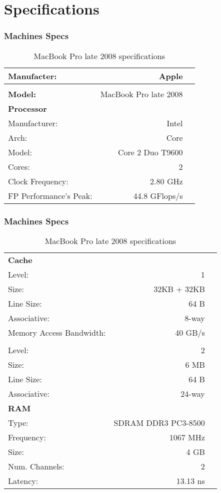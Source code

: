 \documentclass{beamer}
\begin{document}
\section{Specifications}
\begin{frame}
	\frametitle{Machines Specs}
	{\small
	\begin{table}[!htp]
		\begin{tabular}{lrl}
			\hline 
			\textbf{Manufacter:} & Apple \\
			\hline \\
			\textbf{Model:} & MacBook Pro late 2008 \\
			\hline 
			\textbf{Processor} & & \\
			Manufacturer: & Intel & \\
			Arch: & Core & \\
			Model: & Core 2 Duo T9600 & \\
			Cores: & 2 & \\
			Clock Frequency: & 2.80 GHz & \\
			FP Performance's Peak: & 44.8 GFlops/s & \\
			\hline
			\end{tabular}
		\caption{MacBook Pro late 2008 specifications}
		\label{tab:mbp}
\end{table}
}
\end{frame}
\begin{frame}
	\frametitle{Machines Specs}
	{\small
	\begin{table}[!htp]
		\begin{tabular}{lrl}
			\hline 
			\textbf{Cache} & & \\
			Level: & 1 & \\
			Size: & 32KB + 32KB & \\
			Line Size: & 64 B & \\
			Associative: & 8-way & \\
			Memory Access Bandwidth: & 40 GB/s & \\
			\\
			Level: & 2 & \\
			Size: & 6 MB & \\
			Line Size: & 64 B & \\
			Associative: & 24-way & \\
			\hline 
			\textbf{RAM} \\
			Type: & SDRAM DDR3 PC3-8500 & \\
			Frequency: & 1067 MHz & \\
			Size: & 4 GB & \\
			Num. Channels: & 2 & \\
			Latency: & 13.13 ns & \\
		\end{tabular}
		\caption{MacBook Pro late 2008 specifications}
		\label{tab:mbp}
\end{table}
}
\end{frame}
\end{document}
